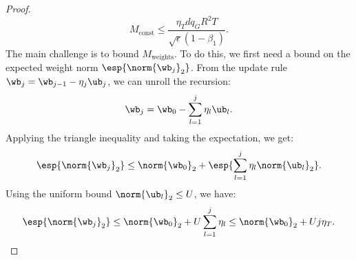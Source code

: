 \documentclass[11pt, letterpaper]{article}
\begin{document}
\begin{proof}
\begin{equation}
    M_{\text{const}} \le \frac{\eta_T d q_G R^2 T}{\sqrt{\epsilon}(1-\beta_1)}.
\end{equation}
The main challenge is to bound $M_{\text{weights}}$. To do this, we first need a bound on the expected weight norm $\esp{\norm{\wb_j}_2}$. From the update rule $\wb_j = \wb_{j-1} - \eta_j \ub_j$, we can unroll the recursion:
\begin{equation*}
    \wb_j = \wb_0 - \sum_{l=1}^j \eta_l \ub_l.
\end{equation*}
Applying the triangle inequality and taking the expectation, we get:
\begin{equation*}
    \esp{\norm{\wb_j}_2} \le \norm{\wb_0}_2 + \esp{\sum_{l=1}^j \eta_l \norm{\ub_l}_2}.
\end{equation*}
Using the uniform bound $\norm{\ub_l}_2 \le U$, we have:
\begin{equation*}
    \esp{\norm{\wb_j}_2} \le \norm{\wb_0}_2 + U \sum_{l=1}^j \eta_l \le \norm{\wb_0}_2+Uj\eta_T .
\end{equation*}


\end{proof}
\end{document}
